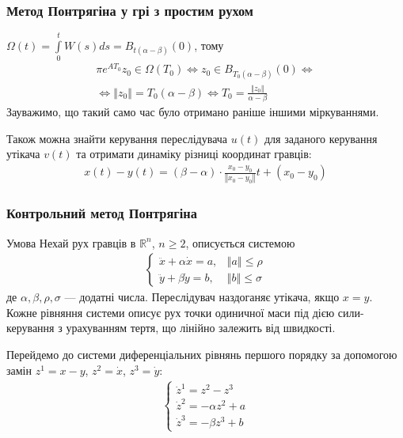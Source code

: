 \documentclass[10pt,pdf,aspectratio=169]{beamer}
\newcommand{\R}{\mathbb{R}}
\renewcommand{\d}[1]{\dot{#1}}
\newcommand{\dd}[1]{\ddot{#1}}
\newcommand{\norm}[1]{\left\Vert #1 \right\Vert}
\newcommand{\intl}{\int\limits}
\begin{document}
    \begin{frame}
        \frametitle{Метод Понтрягіна у грі з простим рухом}
        $\Omega(t) = \intl_0^t W(s)ds = B_{t(\alpha - \beta)}(0)$, тому
        \begin{gather*}
            \pi e^{AT_0} z_0 \in \Omega(T_0) \Leftrightarrow z_0 \in B_{T_0(\alpha - \beta)}(0) \Leftrightarrow 
            \\ \Leftrightarrow
            \norm{z_0} = T_0(\alpha - \beta) \Leftrightarrow T_0 = \frac{\norm{z_0}}{\alpha - \beta}
        \end{gather*}
        Зауважимо, що такий само час було отримано раніше іншими міркуваннями.

        Також можна знайти керування переслідувача $u(t)$ для заданого керування утікача $v(t)$ та отримати
        динаміку різниці координат гравців:
        \begin{gather*}
            x(t) - y(t) = (\beta - \alpha)\cdot \frac{x_0 - y_0}{\norm{x_0 - y_0}} t + (x_0 - y_0)
        \end{gather*}
    \end{frame}
    \begin{frame}
        \frametitle{Контрольний метод Понтрягіна}
    
        \begin{block}{Умова}
            Нехай рух гравців в $\R^n$, $n\geq 2$, описується системою
            \begin{gather*}
                \begin{cases}
                    \dd{x} + \alpha \d{x} = a, & \norm{a} \leq \rho \\
                    \dd{y} + \beta \d{y} = b, & \norm{b} \leq \sigma
                \end{cases}
            \end{gather*}
            де $\alpha, \beta, \rho, \sigma$ --- додатні числа. Переслідувач наздоганяє утікача, якщо $x=y$.
            Кожне рівняння системи описує рух точки одиничної маси під дією сили-керування з урахуванням тертя,
            що лінійно залежить від швидкості.
        \end{block}

        Перейдемо до системи диференціальних рівнянь першого порядку за допомогою замін $z^1 = x - y$, $z^2 = \d{x}$, $z^3 = \d{y}$:
        \begin{gather*}
            \begin{cases}
                \d{z}^1 = z^2 - z^3 \\
                \d{z}^2 = -\alpha z^2 + a \\
                \d{z}^3 = -\beta z^3 + b
            \end{cases}
        \end{gather*}
    \end{frame}
\end{document}
